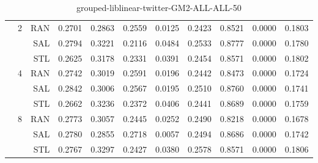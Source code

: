 \begin{center}
\begin{table}[htbp]
\begin{center}
\begin{tabular}{ | r | r | r | r | r | r | r | r | r | r | r |}
 & \multirow{3}{*}{2} & RAN & 0.2701 & 0.2863 & 0.2559 & 0.0125 & 0.2423 & 0.8521 & 0.0000 & 0.1803\\ \cline{3-11}
 &   & SAL & 0.2794 & 0.3221 & 0.2116 & 0.0484 & 0.2533 & 0.8777 & 0.0000 & 0.1780\\ \cline{3-11}
 &   & STL & 0.2625 & 0.3178 & 0.2331 & 0.0391 & 0.2454 & 0.8571 & 0.0000 & 0.1802\\ \cline{2-11}
 & \multirow{3}{*}{4} & RAN & 0.2742 & 0.3019 & 0.2591 & 0.0196 & 0.2442 & 0.8473 & 0.0000 & 0.1724\\ \cline{3-11}
 &   & SAL & 0.2842 & 0.3006 & 0.2567 & 0.0195 & 0.2510 & 0.8760 & 0.0000 & 0.1741\\ \cline{3-11}
 &   & STL & 0.2662 & 0.3236 & 0.2372 & 0.0406 & 0.2441 & 0.8689 & 0.0000 & 0.1759\\ \cline{2-11}
 & \multirow{3}{*}{8} & RAN & 0.2773 & 0.3057 & 0.2445 & 0.0252 & 0.2490 & 0.8218 & 0.0000 & 0.1678\\ \cline{3-11}
 &   & SAL & 0.2780 & 0.2855 & 0.2718 & 0.0057 & 0.2494 & 0.8686 & 0.0000 & 0.1742\\ \cline{3-11}
 &   & STL & 0.2767 & 0.3297 & 0.2427 & 0.0380 & 0.2578 & 0.8571 & 0.0000 & 0.1806\\ \cline{2-11}
\hline
\end{tabular}
\caption{grouped-liblinear-twitter-GM2-ALL-ALL-50}
\end{center}
 \end{table}
\end{center}

